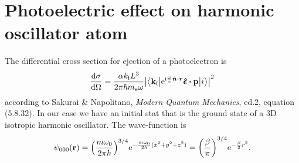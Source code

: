 \documentclass[11pt,letter, swedish, english
]{article}
\begin{document}
\section{Photoelectric effect on harmonic oscillator atom}
\newcommand{\kf}{k_{\text{f}}}
\newcommand{\vkf}{\vb{k}_{\text{f}}}
\newcommand{\vq}{\vb{q}}
The differential cross section for ejection of a photoelectron is
\begin{equation}
\dv{\sigma}{\Omega}=\frac{\alpha \kf L^3}{2\pi\hbar m_\ee\omega}
\abs{\mel**{\vkf}{\ee^{\ii\frac{\omega}{c}\vu*{n}\vdot\vb*{r}}
\vu*{\epsilon}\vdot\vb{p}}{i}}^2 
\end{equation}
according to Sakurai \& Napolitano,
\textit{Modern Quantum Mechanics}, ed.2, equation (5.8.32). In our
case we have an initial stat that is the ground state of a 3D
isotropic harmonic oscillator. The wave-function is
\begin{equation}
\psi_{000}(\vb{r})=\qty(\frac{m\omega_0}{2\pi\hbar})^{3/4}
\mathrm{e}^{-\frac{m\omega_0}{2\hbar}(x^2+y^2+z^2)}
=\qty(\frac{\beta}{\pi})^{3/4}\mathrm{e}^{-\frac{\beta}{2}r^2}.
\end{equation}
\end{document}
